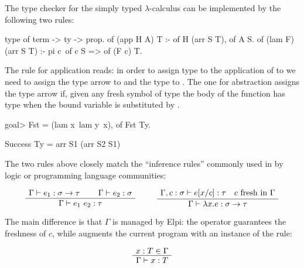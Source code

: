 \documentclass[a4paper, 11pt]{book}
\newenvironment{bprooftree}
  {\leavevmode\hbox\bgroup}
  {\DisplayProof\egroup}
\begin{document}

The type checker for the simply typed $\lambda$-calculus can be implemented by
the following two rules:

\begin{elpicode}
type of term -> ty -> prop.
of (app H A) T :- of H (arr S T), of A S.
of (lam F) (arr S T) :- pi c\ of c S => of (F c) T.
\end{elpicode}

The rule for application reads: in order to assign type  to
the application of  to  we need to assign
the type  arrow  to  and
the type  to . The one for abstraction
assigns the type  arrow  if, given any
fresh symbol  of type  the body of
the function  has type  when the bound variable
is substituted by .

\begin{elpicode}
goal> Fst = (lam x\ lam y\ x), of Fst Ty.

Success
  Ty = arr S1 (arr S2 S1)
\end{elpicode}

The two rules above closely match the ``inference rules'' commonly used in
by logic or programming language communities:
\label{inf:stlc}

$$
\begin{bprooftree}
  \AxiomC{$\Gamma \vdash e_1 : \sigma \to \tau$}
  \AxiomC{$\Gamma \vdash e_2 : \sigma$}
  \BinaryInfC{$\Gamma \vdash e_1~e_2 : \tau$}
\end{bprooftree}
\qquad
\begin{bprooftree}
  \AxiomC{$\Gamma, c : \sigma \vdash e[x/c] : \tau \quad c~\mathrm{fresh~in}~\Gamma$}
  \UnaryInfC{$\Gamma \vdash \lambda x.e : \sigma \to \tau$}
\end{bprooftree}
$$



The main difference is that $\Gamma$ is managed by Elpi: the 
operator guarantees the freshness of $c$, while \elpi{=>} augments
the current program with an instance of the rule:

$$
\begin{bprooftree}
  \AxiomC{$x : T \in \Gamma$}
  \UnaryInfC{$\Gamma \vdash x : T$}
\end{bprooftree}
$$
\end{document}
